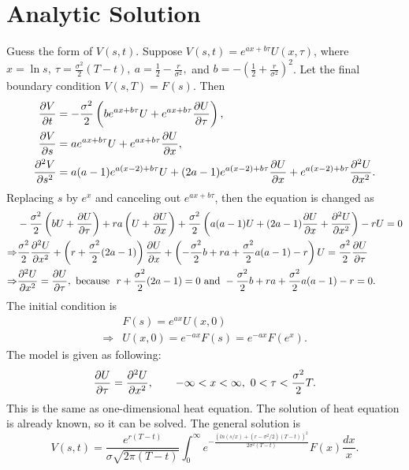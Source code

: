 \section{Analytic Solution}
	Guess the form of $V(s,t)$. Suppose $V(s,t) = e^{ax+b\tau}U(x,\tau)$, where $x=\ln s,\ \tau = \frac{\sigma^2}{2}(T-t),\ a = \frac{1}{2}-\frac{r}{\sigma^2},$ and $b=-(\frac{1}{2}+\frac{r}{\sigma^2})^2$. Let the final boundary condition $V(s,T) = F(s)$. Then
	\begin{align*}
		\frac{\partial V}{\partial t} &= -\frac{\sigma^2}{2}\left(be^{ax+b\tau}U + e^{ax+b\tau}\frac{\partial U}{\partial\tau}\right), \\
		\frac{\partial V}{\partial s} &= ae^{ax+b\tau}U + e^{ax+b\tau}\frac{\partial U}{\partial x},\\
		\frac{\partial^{2}V}{\partial s^{2}} &= a(a-1)e^{a(x-2)+b\tau}U + (2a-1)e^{a(x-2)+b\tau}\frac{\partial U}{\partial x} + e^{a(x-2)+b\tau}\frac{\partial^{2}U}{\partial x^{2}}.
	\end{align*}
	Replacing $s$ by $e^x$ and canceling out $e^{ax+b\tau}$, then the equation is changed as
	\begin{align*}
		&-\frac{\sigma^2}{2}\left(bU+\frac{\partial U}{\partial\tau}\right) + ra\left(U+\frac{\partial U}{\partial x}\right) + \frac{\sigma^2}{2} \left(a(a-1)U+(2a-1)\frac{\partial U}{\partial x}+\frac{\partial^{2}U}{\partial x^{2}}\right) - rU = 0\\
		\Rightarrow & \frac{\sigma^2}{2}\frac{\partial^{2}U}{\partial x^{2}} + \left(r+\frac{\sigma^2}{2}(2a-1)\right)\frac{\partial U}{\partial x} + \left(-\frac{\sigma^2}{2}b+ra+\frac{\sigma^2}{2}a(a-1)-r\right)U = \frac{\sigma^2}{2}\frac{\partial U}{\partial\tau}\\
		\Rightarrow & \frac{\partial^{2}U}{\partial x^{2}} = \frac{\partial U}{\partial\tau}, \mbox{ because } \ r+\frac{\sigma^2}{2}(2a-1) = 0 \mbox{ and } -\frac{\sigma^2}{2}b+ra+\frac{\sigma^2}{2}a(a-1)-r = 0.
	\end{align*}
	The initial condition is
	\begin{align*}
		& F(s) = e^{ax}U(x,0)\\
		\Rightarrow & U(x,0) = e^{-ax}F(s) = e^{-ax}F(e^x).
	\end{align*}
	The model is given as following:
	\begin{equation*}
		\frac{\partial U}{\partial\tau} = \frac{\partial^{2}U}{\partial x^{2}}, \qquad -\infty < x < \infty,\ 0 < \tau < \frac{\sigma^2}{2}T.
	\end{equation*}
	This is the same as one-dimensional heat equation. The solution of heat equation is already known, so it can be solved. The general solution is 
	\begin{equation*}
		V(s,t) = \frac{e^{r(T-t)}}{\sigma\sqrt{2\pi(T-t)}}\int_{0}^{\infty} e^{-\frac{\left(ln(s/x)+(r-\sigma^2/2)(T-t)\right)^2}{2\sigma^2(T-t)}}F(x) \frac{dx}{x}.
	\end{equation*}
